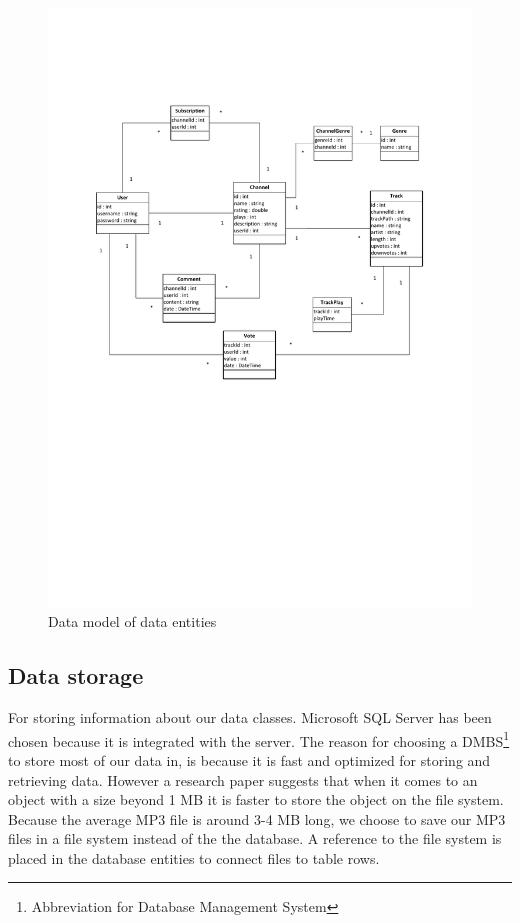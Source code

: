 \documentclass[a4paper,11pt,report]{article}
\begin{document}
\begin{figure}[H]
  \centering
\includegraphics[width=420pt,keepaspectratio=true,trim=60pt 300pt 60pt 80pt]{./ermodel.pdf}
\caption{Data model of data entities}
\end{figure}
\subsection{Data storage}
For storing information about our data classes. Microsoft SQL Server has been chosen because it is integrated with the server. The reason for choosing a DMBS\footnote[1]{Abbreviation for Database Management System} to store most of our data in, is because it is fast and optimized for storing and retrieving data. However a research paper\cite{Russel} suggests that when it comes to an object with a size beyond 1 MB it is faster to store the object on the file system. Because the average MP3 file is around 3-4 MB long, we choose to save our MP3 files in a file system instead of the the database. A reference to the file system is placed in the database entities to connect files to table rows.
\end{document}
